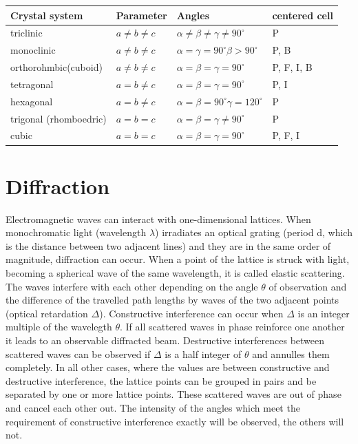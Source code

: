 \renewcommand{\arraystretch}{1.2}
\begin{table}[!htpb]
\centering
{}
\begin{tabular}{|l|l|l|l|}
\hline
\textbf{Crystal system} & \textbf{Parameter} & \textbf{Angles} & \textbf{centered cell}\\
\hline
triclinic & $a\neq b\neq c$ & $\alpha\neq\beta\neq\gamma\neq 90^\circ$ & P\\
\hline
monoclinic & $a\neq b\neq c$ & $\alpha=\gamma=90^\circ \beta>90^\circ$ & P, B\\
\hline
orthorohmbic(cuboid) & $a\neq b\neq c$ & $\alpha=\beta=\gamma= 90^\circ$ & P, F, I, B \\
\hline
tetragonal & $a= b\neq c$ & $\alpha=\beta=\gamma= 90^\circ$ & P, I \\
\hline
hexagonal & $a= b\neq c$ & $\alpha=\beta= 90^\circ \gamma=120^\circ$ & P\\
\hline
trigonal (rhomboedric) & $a= b= c$ & $\alpha=\beta=\gamma\neq 90^\circ$ & P\\
\hline
cubic & $a= b = c$ & $\alpha=\beta=\gamma= 90^\circ$ & P, F, I\\ 
\hline
\end{tabular}
\label{tab:cryssys}
\end{table}

 \section{Diffraction}
 Electromagnetic waves can  interact with one-dimensional lattices. When monochromatic light (wavelength $\lambda$)  irradiates an optical grating (period d, which is the distance between two adjacent lines) and they are in the same order of magnitude, diffraction can occur. When a point of the lattice is struck with light, becoming a spherical wave of the same wavelength, it is called elastic scattering. The waves interfere with each other depending on the angle $\theta$ of observation and  the difference of the travelled path lengths by waves of the two adjacent points (optical retardation $\Delta$). Constructive interference can occur when $\Delta$ is an integer multiple of the wavelegth $\theta$. If all scattered waves in phase reinforce one another it leads to an observable diffracted beam. Destructive interferences between scattered waves can be observed if $\Delta$ is a half integer of $\theta$ and annulles them completely. In all other cases, where the values are between constructive and destructive interference, the lattice points can be grouped in pairs and be separated by one or more lattice points. These scattered waves are out of phase and cancel each other out. The intensity of the angles which meet the requirement of constructive interference exactly will be observed, the others will not.
 
